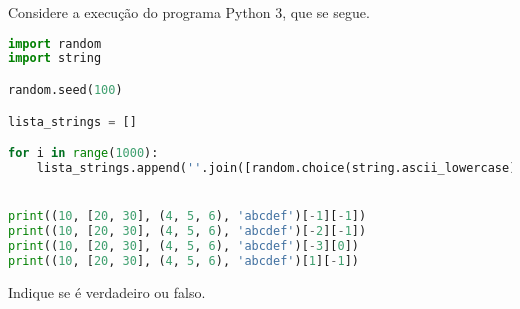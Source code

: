 \documentclass[12pt,varwidth=16cm,border=17pt]{standalone}
\begin{document}
Considere a execução do programa Python 3, que se segue. 

\begin{lstlisting}[language=Python]
import random
import string

random.seed(100)

lista_strings = []

for i in range(1000):
	lista_strings.append(''.join([random.choice(string.ascii_lowercase) for i in range(7)]))


print((10, [20, 30], (4, 5, 6), 'abcdef')[-1][-1])
print((10, [20, 30], (4, 5, 6), 'abcdef')[-2][-1])
print((10, [20, 30], (4, 5, 6), 'abcdef')[-3][0])
print((10, [20, 30], (4, 5, 6), 'abcdef')[1][-1])
\end{lstlisting}

Indique se é verdadeiro ou falso.
\end{document}
